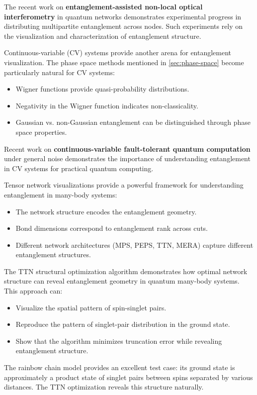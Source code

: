 \documentclass[12pt,a4paper]{article}
\begin{document}
The recent work on \textbf{entanglement-assisted non-local optical interferometry} in quantum networks demonstrates experimental progress in distributing multipartite entanglement across nodes. Such experiments rely on the visualization and characterization of entanglement structure.

Continuous-variable (CV) systems provide another arena for entanglement visualization. The phase space methods mentioned in \cref{sec:phase-space} become particularly natural for CV systems:
\begin{itemize}
	\item Wigner functions provide quasi-probability distributions.
	\item Negativity in the Wigner function indicates non-classicality.
	\item Gaussian vs. non-Gaussian entanglement can be distinguished through phase space properties.
\end{itemize}

Recent work on \textbf{continuous-variable fault-tolerant quantum computation} under general noise demonstrates the importance of understanding entanglement in CV systems for practical quantum computing.

Tensor network visualizations provide a powerful framework for understanding entanglement in many-body systems:
\begin{itemize}
	\item The network structure encodes the entanglement geometry.
	\item Bond dimensions correspond to entanglement rank across cuts.
	\item Different network architectures (MPS, PEPS, TTN, MERA) capture different entanglement structures.
\end{itemize}

The TTN structural optimization algorithm \cite{Hikihara2024} demonstrates how optimal network structure can reveal entanglement geometry in quantum many-body systems. This approach can:
\begin{itemize}
	\item Visualize the spatial pattern of spin-singlet pairs.
	\item Reproduce the pattern of singlet-pair distribution in the ground state.
	\item Show that the algorithm minimizes truncation error while revealing entanglement structure.
\end{itemize}

The rainbow chain model provides an excellent test case: its ground state is approximately a product state of singlet pairs between spins separated by various distances. The TTN optimization reveals this structure naturally.
\end{document}
